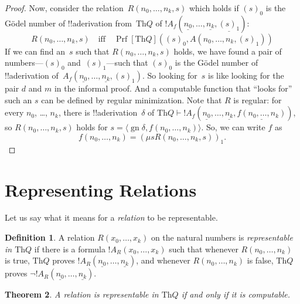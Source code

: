 \documentclass[10pt,a4paper]{article}
\theoremstyle{plain}
\newtheorem{thm}{Theorem}[section]
\theoremstyle{definition}
\newtheorem{defn}[thm]{Definition}
\theoremstyle{remark}
\newcommand*{\olfileid}[3]{}
\newcommand*{\olsection}[1]{\section*{#1}}
\newcommand*{\ollabel}[1]{\label{#1}}
\providecommand{\Proves}{\mathrel{\vdash}}
\providecommand{\Th}{\ensuremath{\mathrm{Th}}}
\providecommand{\tuple}[1]{\langle #1 \rangle}
\providecommand{\num}[1]{\underline{#1}}
\providecommand{\Prf}{\operatorname{Prf}}
\providecommand{\Gn}{\operatorname{gn}}
\providecommand{\umin}{\mu}
\begin{document}
\begin{proof}
Now, consider the relation~$R(n_0, \dots, n_k, s)$ which holds if
$(s)_0$ is the G\"odel number of !!a{derivation} from~$\Th{Q}$ of
$!A_f(\num{n_0}, \dots, \num{n_k}, \num{(s)_1})$:
\[
R(n_0, \dots, n_k, s) \quad\text{iff}\quad \Prf[\Th{Q}]((s)_0, A(n_0,
\dots, n_k, (s)_1))
\]
If we can find an~$s$ such that $R(n_0, \dots, n_k, s)$ holds, we have
found a pair of numbers---$(s)_0$ and~$(s)_1$---such that $(s)_0$ is
the G\"odel number of !!a{derivation} of~$A_f(\num{n_0}, \dots,
\num{n_k}, (s)_1)$. So looking for~$s$ is like looking for the pair
$d$ and $m$ in the informal proof. And a computable function that
``looks for'' such an $s$ can be defined by regular minimization.
Note that $R$ is regular: for every $n_0$, \dots, $n_k$, there is
!!a{derivation}~$\delta$ of $\Th{Q} \Proves !A_f(\num{n_0}, \dots,
\num{n_k}, \num{f(n_0, \dots, n_k)})$, so $R(n_0, \dots, n_k, s)$
holds for $s = \tuple{\Gn{\delta}, f(n_0, \dots, n_k)}$.  So, we can
write $f$ as
\[
f(n_0,\dots,n_{k}) = (\umin{s}{R(n_0, \dots, n_k, s)})_1.
\]
\end{proof}





\olfileid{inc}{req}{rel}

\olsection{Representing Relations}

Let us say what it means for a \emph{relation} to be representable.

\begin{defn}
\ollabel{defn:representing-relations} A relation $R(x_0,\dots,x_k)$ on
the natural numbers is {\em representable in $\Th{Q}$} if there is a
formula $!A_R(x_0,\dots,x_k)$ such that whenever $R(n_0,\dots,n_k)$ is
true, $\Th{Q}$ proves $!A_R(\num{n_0},\dots,\num{n_k})$, and whenever
$R(n_0,\dots,n_k)$ is false, $\Th{Q}$ proves $\lnot !A_R(\num{n_0},
\dots, \num{n_k})$.
\end{defn}

\begin{thm}
\ollabel{thm:representing-rels} A relation is representable in
$\Th{Q}$ if and only if it is computable.
\end{thm}
\end{document}
